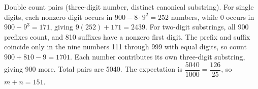 Double count pairs (three-digit number, distinct canonical substring). For single digits, each nonzero digit occurs in $900-8\cdot 9^2=252$ numbers, while 0 occurs in $900-9^3=171$, giving $9(252)+171=2439$. For two-digit substrings, all 900 prefixes count, and 810 suffixes have a nonzero first digit. The prefix and suffix coincide only in the nine numbers 111 through 999 with equal digits, so count $900+810-9=1701$. Each number contributes its own three-digit substring, giving 900 more. Total pairs are 5040. The expectation is $\dfrac{5040}{1000}=\dfrac{126}{25}$, so $m+n=\boxed{151}$.
